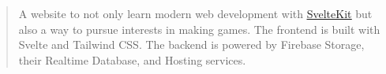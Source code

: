 \begin{cvparagraph}
\begin{quote}
\thinspace A website to not only learn modern web development with \href{https://kit.svelte.dev/}{\underline{SvelteKit}} but also a way to pursue interests in making games. The 
frontend is built with Svelte and Tailwind CSS. The backend is powered by Firebase Storage, their Realtime Database, and Hosting services. 
\end{quote}



\end{cvparagraph}
